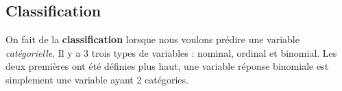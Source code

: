\documentclass[french]{article}
\begin{document}
\begin{multicols*}{2}
%
%





\newpage
\section{Classification}\label{sec:classification}
On fait de la \textbf{classification} lorsque nous voulons prédire une variable \textit{catégorielle}. Il y a 3 trois types de variables : nominal, ordinal et binomial. Les deux premières ont été définies plus haut, une variable réponse binomiale est simplement une variable ayant 2 catégories.


\end{multicols*}
\end{document}
